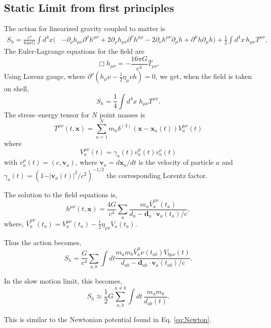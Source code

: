 \documentclass[11pt]{article}
\newcommand{\mink}{\eta_{\mu\nu}}
\newcommand{\munu}{\mu\nu}
\begin{document}
\subsection{Static Limit from first principles}
The action for linearized gravity coupled to matter is
\begin{equation}
\begin{aligned}
	S_{h} = \frac{c^4}{64 \pi G} \int d^4 x \Big( &-\partial_{\rho} h_{\mu \nu} \partial^{\rho} h^{\mu \nu} + 2 \partial_{\rho} h_{\mu \nu} \partial^{\nu} h^{\mu \rho} 
	- 2 \partial_{\nu} h^{\mu \nu} \partial_{\mu} h + \partial^{\mu} h \partial_{\mu} h \Big)
	+ \frac{1}{2} \int d^4 x \,h_{\mu \nu} T^{\mu \nu},
\end{aligned}
\end{equation}
The Euler-Lagrange equations for the field are
\begin{equation}
	\Box h_{\mu \nu} = -\frac{16 \pi G}{c^4} \bar{T}_{\mu \nu}.
\end{equation}
Using Lorenz gauge, where $\partial^{\nu} (h_\munu - \frac12 \eta_\munu h) = 0$, we get, when the field is taken on shell,
\begin{equation}
	S_{h} = \frac{1}{4} \int d^4x \; h_{\mu \nu} T^{\mu \nu}.
\end{equation}
The stress--energy tensor for $N$ point masses is
 \begin{equation} \label{TmunuG-supp} 
 	T^{\mu \nu} (t,\bm{x}) = \sum_{a=1}^N m_a  \delta^{(3)} (\bm{x} - \bm{x}_a(t)) V_a^{\mu \nu} (t)
 \end{equation}
where
\begin{equation}
  V^{\mu \nu}_a(t) = \gamma_a (t) v_{a}^{\mu}(t) v_{a}^{ \nu}(t)
\end{equation}
with $v^{\mu}_a(t) = (c, \bm{v}_a )$, where $\bm{v}_a= d\bm x_a / dt$ is the velocity of particle $a$ and $\gamma_a(t) =  (1 - \vert\bm{v}_a(t)\vert^2/c^2)^{-1/2}$ the corresponding Lorentz factor.

The solution to the field equations is,
\begin{equation}
	h^{\mu \nu}(t,\bm{x}) =  \frac{4 G }{c^4} \sum_a   \frac{m_a \bar{V}^{\mu \nu}_a(t_a)}{d_a - \bm{d}_a \cdot \bm{v}_a(t_a)/c},
\end{equation}
where, $\bar{V}^{\mu \nu}_a(t_a) = V^{\mu \nu}_a(t_a) - \frac{1}{2}\mink V_a(t_a)$.

Thus the action becomes,
\begin{equation}
    S_h = \frac{G}{c^4}\sum_{a,b}\int dt \frac{m_a m_b  \bar V_a^\munu(t_{ab}) V_{b\munu}(t)}{d_{ab}-\bm d_{ab}\cdot\bm v_{a}(t_{ab})/c}.
\end{equation}

In the slow motion limit, this becomes,
\begin{equation}
	S_{h} \approx \frac{1}{2} G \sum_{a,b}^{a \neq b}  \int \! dt \, \frac{m_a m_b}{d_{ab}(t)}.
\end{equation}

This is similar to the Newtonian potential found in Eq. \ref{eq:Newton}.

\newpage
    
\end{document}
